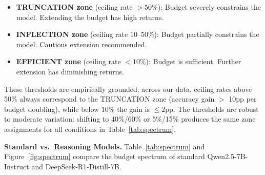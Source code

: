 \documentclass{article}
\begin{document}
\begin{itemize}
    \item \textbf{TRUNCATION zone} (ceiling rate $> 50\%$): Budget severely constrains the model. Extending the budget has high returns.
    \item \textbf{INFLECTION zone} (ceiling rate $10$--$50\%$): Budget partially constrains the model. Cautious extension recommended.
    \item \textbf{EFFICIENT zone} (ceiling rate $< 10\%$): Budget is sufficient. Further extension has diminishing returns.
\end{itemize}

These thresholds are empirically grounded: across our data, ceiling rates above 50\% always correspond to the TRUNCATION zone (accuracy gain $>$ 10pp per budget doubling), while below 10\% the gain is $\leq 2$pp. The thresholds are robust to moderate variation: shifting to 40\%/60\% or 5\%/15\% produces the same zone assignments for all conditions in Table~\ref{tab:spectrum}.

\textbf{Standard vs.\ Reasoning Models.}
Table~\ref{tab:spectrum} and Figure~\ref{fig:spectrum} compare the budget spectrum of standard Qwen2.5-7B-Instruct and DeepSeek-R1-Distill-7B.
\end{document}
